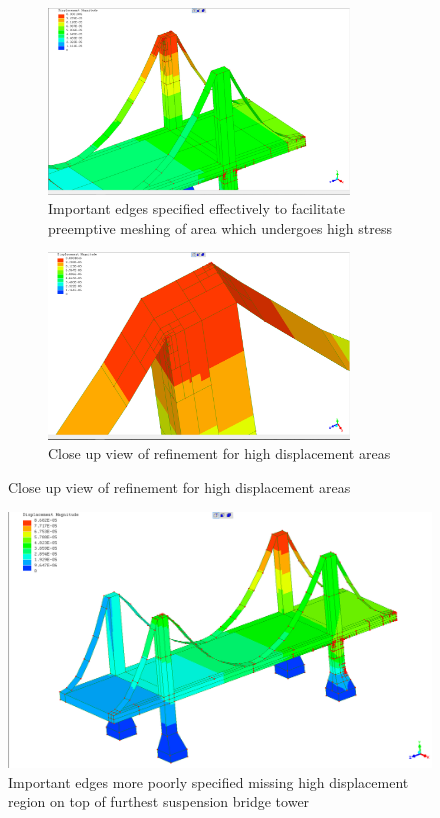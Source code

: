 \begin{figure}[H]
\centering
\begin{subfigure}{.5\textwidth}
  \centering
	\includegraphics[width=80mm, scale=0.5]{../Graphics/BridgeCrossLoading/bestEdgeSpecResults.png}
  \caption{Important edges specified effectively to facilitate preemptive meshing of area which undergoes high stress}
  \label{fig:sub1}
\end{subfigure}%
\begin{subfigure}{.5\textwidth}
  \centering
  \centerline{\includegraphics[width=80mm, scale=0.5]{../Graphics/BridgeCrossLoading/bestEdgeSpecResultsCloseUp.png}}
  \caption{Close up view of refinement for high displacement areas }
  \label{fig:sub2}
\end{subfigure}
\label{fig:test}
\end{figure}


\begin{figure}[H]
  \centerline{\includegraphics[width=165mm, scale=0.5]{../Graphics/BridgeCrossLoading/okEdgeSpecResults.png}}
  \caption{Important edges more poorly specified missing high displacement region on top of furthest suspension bridge tower}
\end{figure}

